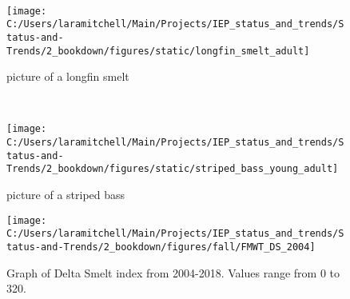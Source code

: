 \documentclass[
]{book}
\begin{document}
\begin{panel-grid}
\begin{columns-nocenter}
\begin{column40}
~

\end{column40}

\begin{column800}

\begin{figure}

{\centering \texttt{[image: C:/Users/laramitchell/Main/Projects/IEP\_status\_and\_trends/Status-and-Trends/2\_bookdown/figures/static/longfin\_smelt\_adult]} 

}

\caption{picture of a longfin smelt}\label{fig:unnamed-chunk-137}
\end{figure}

\end{column800}

\begin{column40}

~

\end{column40}

\begin{column800}

\begin{figure}

{\centering \texttt{[image: C:/Users/laramitchell/Main/Projects/IEP\_status\_and\_trends/Status-and-Trends/2\_bookdown/figures/static/striped\_bass\_young\_adult]} 

}

\caption{picture of a striped bass}\label{fig:unnamed-chunk-138}
\end{figure}

\end{column800}

\end{columns-nocenter}

\begin{columns-nocenter}

\begin{column800}

\begin{expand}

\begin{figure}
\texttt{[image: C:/Users/laramitchell/Main/Projects/IEP\_status\_and\_trends/Status-and-Trends/2\_bookdown/figures/fall/FMWT\_DS\_2004]} \caption{Graph of Delta Smelt index from 2004-2018. Values range from 0 to 320.}\label{fig:unnamed-chunk-139}
\end{figure}

\end{expand}


\end{column800}
\end{columns-nocenter}
\end{panel-grid}
\end{document}
